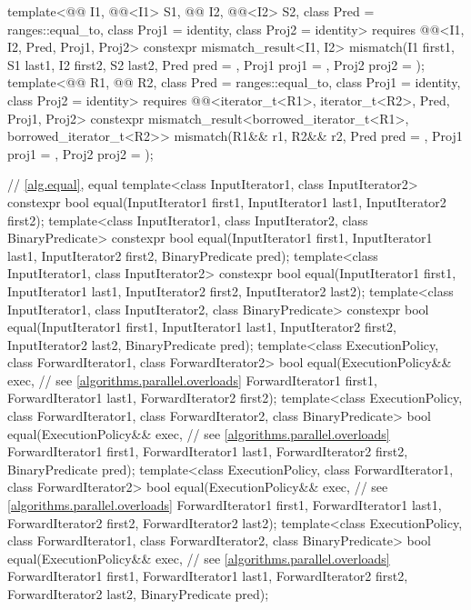 \begin{codeblock}
{{    template<@@ I1, @@<I1> S1, @@ I2, @@<I2> S2,
             class Pred = ranges::equal_to, class Proj1 = identity, class Proj2 = identity>
      requires @@<I1, I2, Pred, Proj1, Proj2>
      constexpr mismatch_result<I1, I2>
        mismatch(I1 first1, S1 last1, I2 first2, S2 last2, Pred pred = {},
                 Proj1 proj1 = {}, Proj2 proj2 = {});
    template<@@ R1, @@ R2,
             class Pred = ranges::equal_to, class Proj1 = identity, class Proj2 = identity>
      requires @@<iterator_t<R1>, iterator_t<R2>, Pred, Proj1, Proj2>
      constexpr mismatch_result<borrowed_iterator_t<R1>, borrowed_iterator_t<R2>>
        mismatch(R1&& r1, R2&& r2, Pred pred = {},
                 Proj1 proj1 = {}, Proj2 proj2 = {});
  }

  // \ref{alg.equal}, equal
  template<class InputIterator1, class InputIterator2>
    constexpr bool equal(InputIterator1 first1, InputIterator1 last1,
                         InputIterator2 first2);
  template<class InputIterator1, class InputIterator2, class BinaryPredicate>
    constexpr bool equal(InputIterator1 first1, InputIterator1 last1,
                         InputIterator2 first2, BinaryPredicate pred);
  template<class InputIterator1, class InputIterator2>
    constexpr bool equal(InputIterator1 first1, InputIterator1 last1,
                         InputIterator2 first2, InputIterator2 last2);
  template<class InputIterator1, class InputIterator2, class BinaryPredicate>
    constexpr bool equal(InputIterator1 first1, InputIterator1 last1,
                         InputIterator2 first2, InputIterator2 last2,
                         BinaryPredicate pred);
  template<class ExecutionPolicy, class ForwardIterator1, class ForwardIterator2>
    bool equal(ExecutionPolicy&& exec,                          // see \ref{algorithms.parallel.overloads}
               ForwardIterator1 first1, ForwardIterator1 last1,
               ForwardIterator2 first2);
  template<class ExecutionPolicy, class ForwardIterator1, class ForwardIterator2,
           class BinaryPredicate>
    bool equal(ExecutionPolicy&& exec,                          // see \ref{algorithms.parallel.overloads}
               ForwardIterator1 first1, ForwardIterator1 last1,
               ForwardIterator2 first2, BinaryPredicate pred);
  template<class ExecutionPolicy, class ForwardIterator1, class ForwardIterator2>
    bool equal(ExecutionPolicy&& exec,                          // see \ref{algorithms.parallel.overloads}
               ForwardIterator1 first1, ForwardIterator1 last1,
               ForwardIterator2 first2, ForwardIterator2 last2);
  template<class ExecutionPolicy, class ForwardIterator1, class ForwardIterator2,
           class BinaryPredicate>
    bool equal(ExecutionPolicy&& exec,                          // see \ref{algorithms.parallel.overloads}
               ForwardIterator1 first1, ForwardIterator1 last1,
               ForwardIterator2 first2, ForwardIterator2 last2,
               BinaryPredicate pred);

}
\end{codeblock}
